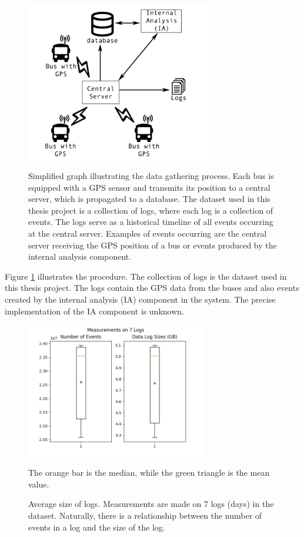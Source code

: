 \begin{figure}
    \centering
    \includegraphics[width=0.75\textwidth]{figures/data-gathering}
    \caption[Simplified graph illustrating the data gathering process]
    {\small Simplified graph illustrating the data gathering process. 
    Each bus is equipped with a GPS sensor and transmits its position to a central server, which is propagated to a database.
    The dataset used in this thesis project is a collection of logs, where each log is a collection of events.
    The logs serve as a historical timeline of all events occurring at the central server.
    Examples of events occurring are the central server receiving the GPS position of a bus or events produced by the internal analysis component.}
    \label{fig:data-gathering}
\end{figure}

Figure \ref{fig:data-gathering} illustrates the procedure.
The collection of logs is the dataset used in this thesis project.
The logs contain the GPS data from the buses and also events created by the internal analysis (IA) component in the system.
The precise implementation of the IA component is unknown.

\begin{figure}[ht!]
    \centering
    \includegraphics[width=0.7\textwidth]{figures/log_sizes}
    \caption[Average size of logs]
    {\small Average size of logs.
    Measurements are made on 7 logs (days) in the dataset.
    Naturally, there is a relationship between the number of events in a log and the size of the log.}
    The orange bar is the median, while the green triangle is the mean value.
    \label{fig:log-sizes}
\end{figure}

